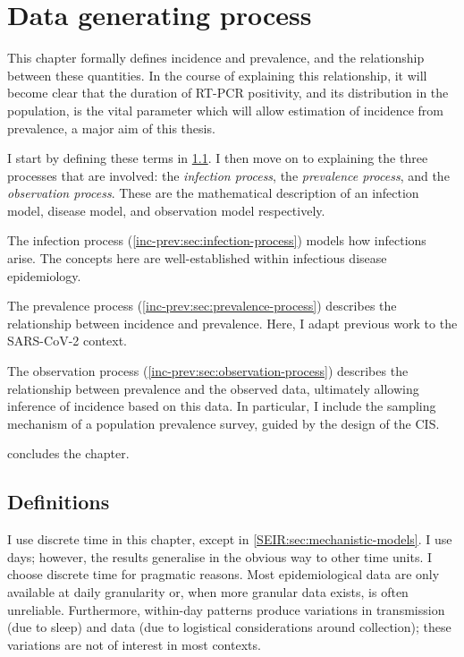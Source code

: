 \documentclass[thesis.tex]{subfiles}
\begin{document}
\ifSubfilesClassLoaded{
  \setcounter{chapter}{2}
}

\chapter{Data generating process} \label{inc-prev}

This chapter formally defines incidence and prevalence, and the relationship between these quantities.
In the course of explaining this relationship, it will become clear that the duration of RT-PCR positivity, and its distribution in the population, is the vital parameter which will allow estimation of incidence from prevalence, a major aim of this thesis.

I start by defining these terms in \cref{inc-prev:sec:definitions}.
I then move on to explaining the three processes that are involved: the \emph{infection process}, the \emph{prevalence process}, and the \emph{observation process}.
These are the mathematical description of an infection model, disease model, and observation model respectively.

The infection process (\cref{inc-prev:sec:infection-process}) models how infections arise.
The concepts here are well-established within infectious disease epidemiology.

The prevalence process (\cref{inc-prev:sec:prevalence-process}) describes the relationship between incidence and prevalence.
Here, I adapt previous work to the SARS-CoV-2 context.

The observation process (\cref{inc-prev:sec:observation-process}) describes the relationship between prevalence and the observed data, ultimately allowing inference of incidence based on this data.
In particular, I include the sampling mechanism of a population prevalence survey, guided by the design of the CIS.

 concludes the chapter.

\section{Definitions} \label{inc-prev:sec:definitions}

I use discrete time in this chapter, except in \cref{SEIR:sec:mechanistic-models}.
I use days; however, the results generalise in the obvious way to other time units.
I choose discrete time for pragmatic reasons.
Most epidemiological data are only available at daily granularity or, when more granular data exists, is often unreliable.
Furthermore, within-day patterns produce variations in transmission (\eg due to sleep) and data (\eg due to logistical considerations around collection); these variations are not of interest in most contexts.
\end{document}
